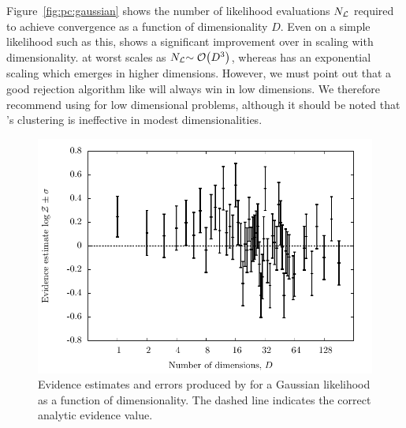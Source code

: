 Figure~\ref{fig:pc:gaussian} shows the number of likelihood evaluations \(N_{\mathcal{L}}\) required to achieve convergence as a function of dimensionality \(D\). 
Even on a simple likelihood such as this, \PolyChord{} shows a significant improvement over \MultiNest{} in scaling with dimensionality.  \PolyChord{} at worst scales as \({N_{\mathcal{L}}{\sim\mathcal{O}{\left(D^3\right)}}}\), whereas \MultiNest{} has an exponential scaling which emerges in higher dimensions.
However, we must point out that a good rejection algorithm like \MultiNest{} will always win in low dimensions. We therefore recommend using \MultiNest{} for low dimensional problems, although it should be noted that \MultiNest{}'s clustering is ineffective in modest dimensionalities.

\begin{figure}[tp]
  \centering
  \includegraphics[width=\columnwidth]{chapters/polychord/figures/gaussian_evidences}
  \caption{%
    Evidence estimates and errors produced by \PolyChord{} for a Gaussian likelihood as a function of dimensionality. The dashed line indicates the correct analytic evidence value.\label{fig:pc:gaussian_evidences}
}
\end{figure}

